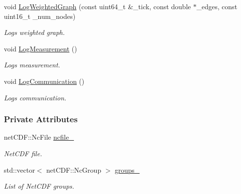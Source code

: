 \begin{DoxyCompactItemize}
void \hyperlink{classosse_1_1collaborate_1_1_data_logger_a07727a2859558a395ab390b3b4d3dccb}{Log\+Weighted\+Graph} (const uint64\+\_\+t \&\+\_\+tick, const double $\ast$\+\_\+edges, const uint16\+\_\+t \+\_\+num\+\_\+nodes)
\begin{DoxyCompactList}\small\item\em Logs weighted graph. \end{DoxyCompactList}\item 
\mbox{\label{classosse_1_1collaborate_1_1_data_logger_a2eb3f81ae43ad620401c3ef93ffe690b}} 
void \hyperlink{classosse_1_1collaborate_1_1_data_logger_a2eb3f81ae43ad620401c3ef93ffe690b}{Log\+Measurement} ()
\begin{DoxyCompactList}\small\item\em Logs measurement. \end{DoxyCompactList}\item 
\mbox{\label{classosse_1_1collaborate_1_1_data_logger_aec7391008520ecbda02f46169823ce2a}} 
void \hyperlink{classosse_1_1collaborate_1_1_data_logger_aec7391008520ecbda02f46169823ce2a}{Log\+Communication} ()
\begin{DoxyCompactList}\small\item\em Logs communication. \end{DoxyCompactList}\end{DoxyCompactItemize}
\subsubsection*{Private Attributes}
\begin{DoxyCompactItemize}
\item 
\mbox{\label{classosse_1_1collaborate_1_1_data_logger_ad24528379ccc57084cdc857c69744e37}} 
net\+C\+D\+F\+::\+Nc\+File \hyperlink{classosse_1_1collaborate_1_1_data_logger_ad24528379ccc57084cdc857c69744e37}{ncfile\+\_\+}
\begin{DoxyCompactList}\small\item\em Net\+C\+DF file. \end{DoxyCompactList}\item 
\mbox{\label{classosse_1_1collaborate_1_1_data_logger_aba3561b8bf7fde66ba88062a3d96a5de}} 
std\+::vector$<$ net\+C\+D\+F\+::\+Nc\+Group $>$ \hyperlink{classosse_1_1collaborate_1_1_data_logger_aba3561b8bf7fde66ba88062a3d96a5de}{groups\+\_\+}
\begin{DoxyCompactList}\small\item\em List of Net\+C\+DF groups. \end{DoxyCompactList}\end{DoxyCompactItemize}


